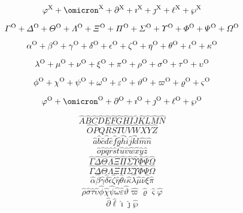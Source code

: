 $$
\varphi^{\rm X}+
\omicron^{\rm X}+
\partial^{\rm X}+
\imath^{\rm X}+
\jmath^{\rm X}+
\ell^{\rm X}+
\wp^{\rm X}
$$

$$
\varGamma^{\rm O}+
\varDelta^{\rm O}+
\varTheta^{\rm O}+
\varLambda^{\rm O}+
\varXi^{\rm O}+
\varPi^{\rm O}+
\varSigma^{\rm O}+
\varUpsilon^{\rm O}+
\varPhi^{\rm O}+
\varPsi^{\rm O}+
\varOmega^{\rm O}
$$

$$
\alpha^{\rm O}+
\beta^{\rm O}+
\gamma^{\rm O}+
\delta^{\rm O}+
\epsilon^{\rm O}+
\zeta^{\rm O}+
\eta^{\rm O}+
\theta^{\rm O}+
\iota^{\rm O}+
\kappa^{\rm O}
$$

$$
\lambda^{\rm O}+
\mu^{\rm O}+
\nu^{\rm O}+
\xi^{\rm O}+
\pi^{\rm O}+
\rho^{\rm O}+
\sigma^{\rm O}+
\tau^{\rm O}+
\upsilon^{\rm O}
$$

$$
\phi^{\rm O}+
\chi^{\rm O}+
\psi^{\rm O}+
\omega^{\rm O}+
\varepsilon^{\rm O}+
\vartheta^{\rm O}+
\varpi^{\rm O}+
\varrho^{\rm O}+
\varsigma^{\rm O}
$$

$$
\varphi^{\rm O}+
\omicron^{\rm O}+
\partial^{\rm O}+
\imath^{\rm O}+
\jmath^{\rm O}+
\ell^{\rm O}+
\wp^{\rm O}
$$





$$
\hat{A} \hat{B} \hat{C} \hat{D} \hat{E} \hat{F} \hat{G} \hat{H} 
\hat{I} \hat{J} \hat{K} \hat{L} \hat{M} \hat{N}
$$
%
$$
\hat{O} \hat{P} \hat{Q} \hat{R} \hat{S} \hat{T} \hat{U} \hat{V} 
\hat{W} \hat{X} \hat{Y} \hat{Z}
$$
%
$$
\hat{a} \hat{b} \hat{c} \hat{d} \hat{e} \hat{f} \hat{g} \hat{h} 
\hat{i} \hat{j} \hat{k} \hat{l} \hat{m} \hat{n}
$$
%
$$
\hat{o} \hat{p} \hat{q} \hat{r} \hat{s} \hat{t} \hat{u} \hat{v} 
\hat{w} \hat{x} \hat{y} \hat{z} 
$$
%
%
%
$$
\hat{\Gamma} \hat{\Delta} \hat{\Theta} \hat{\Lambda} \hat{\Xi} \hat{\Pi} 
\hat{\Sigma} \hat{\Upsilon} \hat{\Phi} \hat{\Psi} \hat{\Omega} 
$$
%
$$
\hat{\varGamma} \hat{\varDelta} \hat{\varTheta} \hat{\varLambda} \hat{\varXi} \hat{\varPi} 
\hat{\varSigma} \hat{\varUpsilon} \hat{\varPhi} \hat{\varPsi} \hat{\varOmega} 
$$
%
$$
\hat{\alpha} \hat{\beta} \hat{\gamma} \hat{\delta} \hat{\epsilon} \hat{\zeta} 
\hat{\eta} \hat{\theta} \hat{\iota} \hat{\kappa} \hat{\lambda} \hat{\mu} \hat{\nu} 
\hat{\xi} \hat{\pi}
$$
%
$$
\hat{\rho} \hat{\sigma} \hat{\tau} \hat{\upsilon} \hat{\phi} 
\hat{\chi} \hat{\psi} \hat{\omega} \hat{\varepsilon} \hat{\vartheta} \hat{\varpi} 
\hat{\varrho} \hat{\varsigma} \hat{\varphi} 
$$
%
$$
\hat{\partial} \hat{\ell} \hat{\imath} \hat{\jmath} \hat{\wp} 
$$

